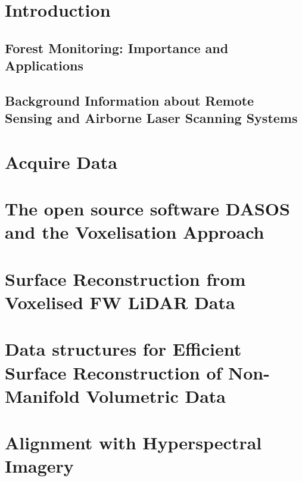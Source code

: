 \documentclass[11pt,nofootinbib]{report}
\begin{document}
	
		
		
	\setcounter{secnumdepth}{4}		

	\chapter{Introduction} \label{Introduction} 	
		\section{Forest Monitoring: Importance and Applications}\label{sec:forestMonitoring}
		
		\section{Background Information about Remote Sensing and Airborne Laser Scanning Systems}\label{Background}
			
			\newpage
			
		
    \chapter{Acquire Data}\label{AcquireData}
		 
	    \newpage

	\chapter{The open source software DASOS and the Voxelisation Approach}\label{DASOS_Voxelisation}
			
	\newpage


		 		
	\chapter{Surface Reconstruction from Voxelised FW LiDAR Data}\label{Visualisations}
		

		\newpage
    \chapter{Data structures for Efficient Surface Reconstruction of Non-Manifold Volumetric Data}\label{Optimisations}
      
			 \newpage
	\chapter{Alignment with Hyperspectral Imagery}\label{Alignment}
		
		\newpage		
\end{document}
